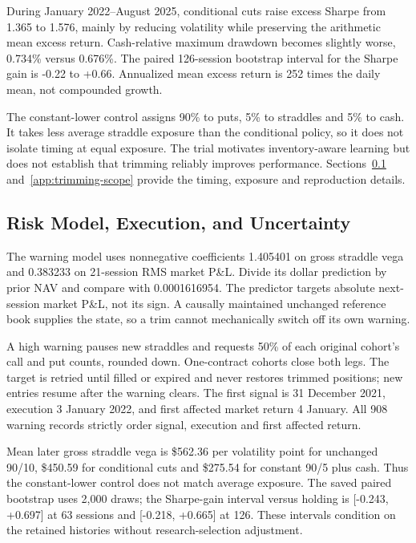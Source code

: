 During January 2022--August 2025, conditional cuts raise excess Sharpe from 1.365 to 1.576, mainly by reducing volatility while preserving the arithmetic mean excess return. Cash-relative maximum drawdown becomes slightly worse, 0.734\% versus 0.676\%. The paired 126-session bootstrap interval for the Sharpe gain is -0.22 to +0.66. Annualized mean excess return is 252 times the daily mean, not compounded growth.


The constant-lower control assigns 90\% to puts, 5\% to straddles and 5\% to cash. It takes less average straddle exposure than the conditional policy, so it does not isolate timing at equal exposure. The trial motivates inventory-aware learning but does not establish that trimming reliably improves performance. Sections~\ref{app:trimming-protocol} and~\ref{app:trimming-scope} provide the timing, exposure and reproduction details.


\FloatBarrier
\FloatBarrier
\subsection{Risk Model, Execution, and Uncertainty}\label{app:trimming-protocol}


The warning model uses nonnegative coefficients 1.405401 on gross straddle vega and 0.383233 on 21-session RMS market P\&L. Divide its dollar prediction by prior NAV and compare with 0.0001616954. The predictor targets absolute next-session market P\&L, not its sign. A causally maintained unchanged reference book supplies the state, so a trim cannot mechanically switch off its own warning.


A high warning pauses new straddles and requests 50\% of each original cohort's call and put counts, rounded down. One-contract cohorts close both legs. The target is retried until filled or expired and never restores trimmed positions; new entries resume after the warning clears. The first signal is 31 December 2021, execution 3 January 2022, and first affected market return 4 January. All 908 warning records strictly order signal, execution and first affected return.


Mean later gross straddle vega is \$562.36 per volatility point for unchanged 90/10, \$450.59 for conditional cuts and \$275.54 for constant 90/5 plus cash. Thus the constant-lower control does not match average exposure. The saved paired bootstrap uses 2,000 draws; the Sharpe-gain interval versus holding is [-0.243, +0.697] at 63 sessions and [-0.218, +0.665] at 126. These intervals condition on the retained histories without research-selection adjustment.



